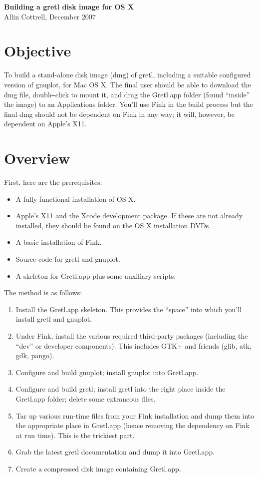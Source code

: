 \documentclass{article}
\begin{document}
\setlength{\parskip}{1ex}
\setlength{\parindent}{0pt}

\begin{center}
  {\large \textbf{Building a gretl disk image for OS X}}\\[6pt]
Allin Cottrell, December 2007
\end{center}

\section{Objective}

To build a stand-alone disk image (dmg) of gretl, including a suitable
configured version of gnuplot, for Mac OS X.  The final user should be
able to download the dmg file, double-click to mount it, and drag the
Gretl.app folder (found ``inside'' the image) to an Applications
folder.  You'll use Fink in the build process but the final dmg should
not be dependent on Fink in any way; it will, however, be dependent on
Apple's X11.

\section{Overview}

First, here are the prerequisites:

\begin{itemize}
\item A fully functional installation of OS X.
\item Apple's X11 and the Xcode development package.  If these are
  not already installed, they should be found on the OS X installation
  DVDs.
\item A basic installation of Fink.
\item Source code for gretl and gnuplot.
\item A skeleton for Gretl.app plus some auxiliary scripts.
\end{itemize}

The method is as follows:

\begin{enumerate}
\item Install the Gretl.app skeleton.  This provides the ``space''
  into which you'll install gretl and gnuplot.
\item Under Fink, install the various required third-party packages
  (including the ``dev'' or developer components).  This includes
  GTK+ and friends (glib, atk, gdk, pango).
\item Configure and build gnuplot; install gnuplot into Gretl.app.
\item Configure and build gretl; install gretl into the right place
  inside the Gretl.app folder; delete some extraneous files.
\item Tar up various run-time files from your Fink installation and
  dump them into the appropriate place in Gretl.app (hence removing
  the dependency on Fink at run time).  This is the trickiest part.
\item Grab the latest gretl documentation and dump it into Gretl.app.
\item Create a compressed disk image containing Gretl.app.
\end{enumerate}
\end{document}
